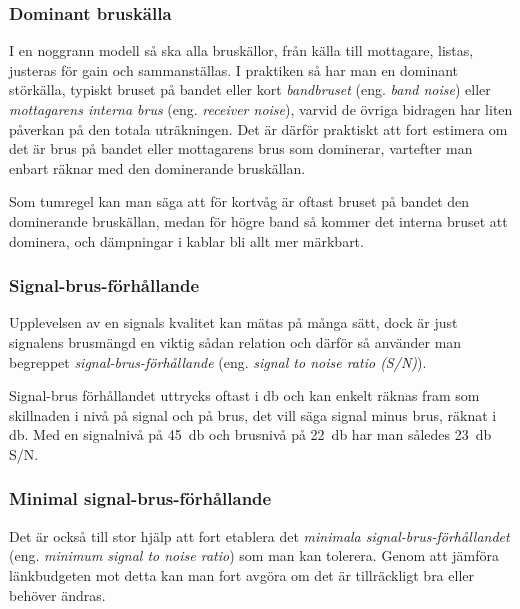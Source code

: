 \subsubsection{Dominant bruskälla}

I en noggrann modell så ska alla bruskällor, från källa till mottagare,
listas, justeras för gain och sammanställas.
I praktiken så har man en dominant störkälla, typiskt bruset på bandet eller
kort \emph{bandbruset} (eng. \emph{band noise}) eller
\emph{mottagarens interna brus} (eng. \emph{receiver noise}),
varvid de övriga bidragen har liten påverkan på den totala uträkningen.
Det är därför praktiskt att fort estimera om det är brus på bandet eller
mottagarens brus som dominerar, vartefter man enbart räknar med den
dominerande bruskällan.

Som tumregel kan man säga att för kortvåg är oftast bruset på bandet
den dominerande bruskällan, medan för högre band så kommer det interna
bruset att dominera, och dämpningar i kablar bli allt mer märkbart.

\subsubsection{Signal-brus-förhållande}

Upplevelsen av en signals kvalitet kan mätas på många sätt, dock är just
signalens brusmängd en viktig sådan relation och därför så använder man
begreppet \emph{signal-brus-förhållande} (eng.
\emph{signal to noise ratio (S/N)}).

Signal-brus förhållandet uttrycks oftast i \si{\decibel} och kan enkelt räknas
fram som skillnaden i nivå på signal och på brus, det vill säga signal minus
brus, räknat i \si{\decibel}.
Med en signalnivå på \SI{45}{\decibel} och brusnivå på \SI{22}{\decibel} har man
således \SI{+23}{\decibel} S/N.

\subsubsection{Minimal signal-brus-förhållande}

Det är också till stor hjälp att fort etablera det \emph{minimala
signal-brus-förhållandet} (eng. \emph{minimum signal to noise ratio})
som man kan tolerera.
Genom att jämföra länkbudgeten mot detta kan man fort avgöra om det är
tillräckligt bra eller behöver ändras.

